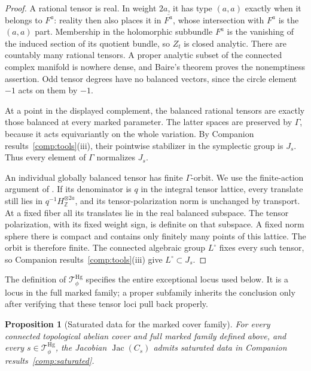 \documentclass[11pt]{article}
\theoremstyle{plain}
\newtheorem{proposition}[theorem]{Proposition}
\theoremstyle{definition}
\theoremstyle{remark}
\numberwithin{equation}{section}
\begin{document}
\begin{proof}
A rational tensor is real.  In weight $2a$, it has type $(a,a)$
exactly when it belongs to $F^a$: reality then also places it in
$\overline{F^a}$, whose intersection with $F^a$ is the $(a,a)$ part.
Membership in the holomorphic subbundle $F^a$ is the vanishing of the
induced section of its quotient bundle, so $Z_t$ is closed analytic.
There are countably many rational tensors.  A proper analytic subset
of the connected complex manifold is nowhere dense, and Baire's theorem
proves the nonemptiness assertion.  Odd tensor degrees have no balanced
vectors, since the circle element $-1$ acts on them by $-1$.

At a point in the displayed complement, the balanced rational tensors
are exactly those balanced at every marked parameter.  The latter
spaces are preserved by $\Gamma$, because it acts equivariantly on the
whole variation.  By Companion results~\ref{comp:tools}\textup{(iii)}, their pointwise
stabilizer in the symplectic group is $J_s$.  Thus every element of
$\Gamma$ normalizes $J_s$.

An individual globally balanced tensor has finite $\Gamma$-orbit.
We use the finite-action argument of
\cite[Section~4, Lemma~4]{Andre1992FixedPart}.
If its denominator is $q$ in the integral tensor lattice, every
translate still lies in $q^{-1}H_{\mathbb Z}^{\otimes 2a}$, and
its tensor-polarization norm is unchanged by transport.  At a fixed
fiber all its translates lie in the real balanced subspace.  The tensor
polarization, with its fixed weight sign, is definite on that subspace.
A fixed norm sphere there is compact and contains only finitely many
points of this lattice.  The orbit is therefore finite.
The connected algebraic group $L^\circ$ fixes every such tensor, so
Companion results~\ref{comp:tools}\textup{(iii)} give $L^\circ\subset J_s$.
\end{proof}

The definition of $\mathcal T_\phi^{\mathrm{Hg}}$ specifies the entire
exceptional locus used below.  It is a locus in the full marked family;
a proper subfamily inherits the conclusion only after verifying that
these tensor loci pull back properly.

\begin{proposition}[Saturated data for the marked cover family]
\label{p4:cover-saturation}
For every connected topological abelian cover and full marked family
defined above, and every \(s\in\mathcal T_\phi^{\mathrm{Hg}}\), the
Jacobian \(\operatorname{Jac}(C_s)\) admits saturated data in
Companion results~\ref{comp:saturated}.
\end{proposition}
\end{document}
